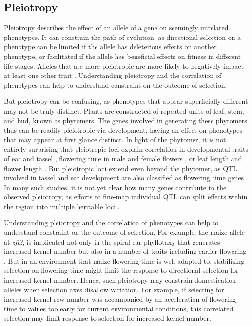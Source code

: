 \documentclass[9pt,twocolumn,twoside]{rilabRxiv}
\begin{document}
\subsection*{Pleiotropy}

Pleiotropy describes the effect of an allele of a gene on seemingly unrelated phenotypes.
It can constrain the path of evolution, as directional selection on a phenotype can be limited if the allele has deleterious effects on another phenotype, or facilitated if the allele has beneficial effects on fitness in different life stages.
Alleles that are more pleiotropic are more likely to negatively impact at least one other trait \citep{fisher1918}.
Understanding pleiotropy and the correlation of phenotypes can help to understand constraint on the outcome of selection.

But pleiotropy  can be confusing, as phenotypes that appear superficially different may not be truly distinct.
Plants are constructed of repeated units of leaf, stem, and bud, known as phytomers.
The genes involved in generating these phytomers thus can be readily pleiotropic via development, having an effect on phenotypes that may appear at first glance distinct.
In light of the phytomer, it is not entirely surprising that pleiotropic loci explain correlation in developmental traits of ear and tassel \citep{brown2011}, flowering time in male and female flowers \citep{buckler2009}, or leaf length and flower length \citep{tian2011}.
But pleiotropic loci extend even beyond the phytomer, as QTL involved in tassel and ear development are also classified as flowering time genes \citep{xu2017}.
In many such studies, it is not yet clear how many genes contribute to the observed pleiotropy, as efforts to fine-map individual QTL can split effects within the region into multiple heritable loci \citep{lemmon2014dissect}.


Understanding pleiotropy and the correlation of phenotypes can help to understand constraint on the outcome of selection.
For example, the maize allele at \textit{zfl2}, is implicated not only in the spiral ear phyllotaxy that generates increased kernel number but also in a number of traits including earlier flowering \citep{bomblies2006}.
But in an environment that maize flowering time is well-adapted to, stabilizing selection on flowering time might limit the response to directional selection for increased kernel number.
Hence, such pleiotropy may constrain domestication alleles when selection axes disallow variation.
For example, if selecting for increased kernel row number was accompanied by an acceleration of flowering time to values too early for current environmental conditions, this correlated selection may limit response to selection for increased kernel number.
\end{document}
